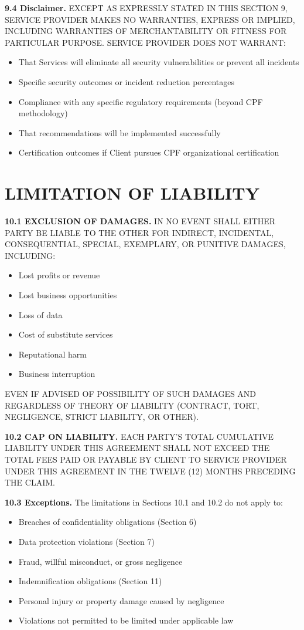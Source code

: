 \documentclass[11pt,a4paper]{article}
\begin{document}
\textbf{9.4 Disclaimer.} EXCEPT AS EXPRESSLY STATED IN THIS SECTION 9, SERVICE PROVIDER MAKES NO WARRANTIES, EXPRESS OR IMPLIED, INCLUDING WARRANTIES OF MERCHANTABILITY OR FITNESS FOR PARTICULAR PURPOSE. SERVICE PROVIDER DOES NOT WARRANT:
\begin{itemize}
\item That Services will eliminate all security vulnerabilities or prevent all incidents
\item Specific security outcomes or incident reduction percentages
\item Compliance with any specific regulatory requirements (beyond CPF methodology)
\item That recommendations will be implemented successfully
\item Certification outcomes if Client pursues CPF organizational certification
\end{itemize}

\section{LIMITATION OF LIABILITY}

\textbf{10.1 EXCLUSION OF DAMAGES.} IN NO EVENT SHALL EITHER PARTY BE LIABLE TO THE OTHER FOR INDIRECT, INCIDENTAL, CONSEQUENTIAL, SPECIAL, EXEMPLARY, OR PUNITIVE DAMAGES, INCLUDING:
\begin{itemize}
\item Lost profits or revenue
\item Lost business opportunities
\item Loss of data
\item Cost of substitute services
\item Reputational harm
\item Business interruption
\end{itemize}

EVEN IF ADVISED OF POSSIBILITY OF SUCH DAMAGES AND REGARDLESS OF THEORY OF LIABILITY (CONTRACT, TORT, NEGLIGENCE, STRICT LIABILITY, OR OTHER).

\textbf{10.2 CAP ON LIABILITY.} EACH PARTY'S TOTAL CUMULATIVE LIABILITY UNDER THIS AGREEMENT SHALL NOT EXCEED THE TOTAL FEES PAID OR PAYABLE BY CLIENT TO SERVICE PROVIDER UNDER THIS AGREEMENT IN THE TWELVE (12) MONTHS PRECEDING THE CLAIM.

\textbf{10.3 Exceptions.} The limitations in Sections 10.1 and 10.2 do not apply to:
\begin{itemize}
\item Breaches of confidentiality obligations (Section 6)
\item Data protection violations (Section 7)
\item Fraud, willful misconduct, or gross negligence
\item Indemnification obligations (Section 11)
\item Personal injury or property damage caused by negligence
\item Violations not permitted to be limited under applicable law
\end{itemize}
\end{document}
